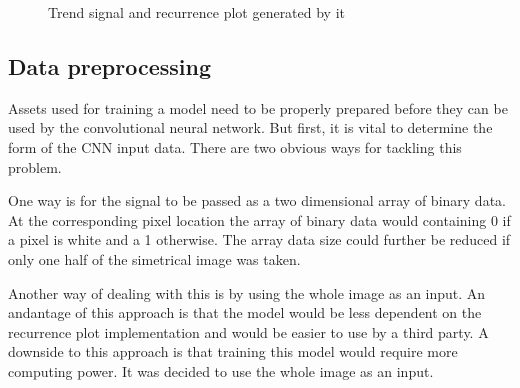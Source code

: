 \documentclass[a4paper,12pt,fleqn]{article}
\begin{document}
\begin{figure}
  \centering
  \qquad
  \caption{Trend signal and recurrence plot generated by it}
  \label{fig:generated_trend}
\end{figure}


\subsection{Data preprocessing}
Assets used for training a model need to be properly prepared before they can be used by the convolutional neural network.
But first, it is vital to determine the form of the CNN input data.
There are two obvious ways for tackling this problem.

One way is for the signal to be passed as a two dimensional array of binary data.
At the corresponding pixel location the array of binary data would containing 0 if a pixel is white and a 1 otherwise.
The array data size could further be reduced if only one half of the simetrical image was taken.

Another way of dealing with this is by using the whole image as an input.
An andantage of this approach is that the model would be less dependent on the recurrence plot implementation and would be easier to use by a third party.
A downside to this approach is that training this model would require more computing power. It was decided to use the whole image as an input.
\end{document}

